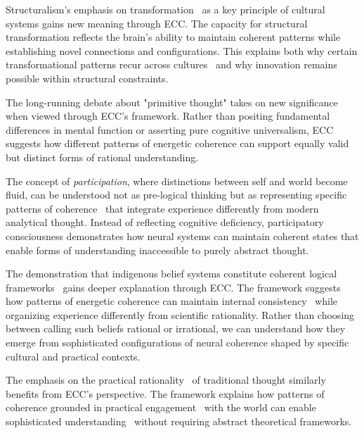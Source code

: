 Structuralism's emphasis on transformation~ as a key principle of cultural systems gains new meaning through ECC. The capacity for structural transformation reflects the brain's ability to maintain coherent patterns while establishing novel connections and configurations. This explains both why certain transformational patterns recur across cultures~ and why innovation remains possible within structural constraints.

The long-running debate about "primitive thought" takes on new significance when viewed through ECC's framework. Rather than positing fundamental differences in mental function or asserting pure cognitive universalism, ECC suggests how different patterns of energetic coherence can support equally valid but distinct forms of rational understanding.

The concept of \textit{participation}, where distinctions between self and world become fluid, can be understood not as pre-logical thinking but as representing specific patterns of coherence~ that integrate experience differently from modern analytical thought. Instead of reflecting cognitive deficiency, participatory consciousness demonstrates how neural systems can maintain coherent states that enable forms of understanding inaccessible to purely abstract thought.

The demonstration that indigenous belief systems constitute coherent logical frameworks~ gains deeper explanation through ECC. The framework suggests how patterns of energetic coherence can maintain internal consistency~ while organizing experience differently from scientific rationality. Rather than choosing between calling such beliefs rational or irrational, we can understand how they emerge from sophisticated configurations of neural coherence shaped by specific cultural and practical contexts.

The emphasis on the practical rationality~ of traditional thought similarly benefits from ECC's perspective. The framework explains how patterns of coherence grounded in practical engagement~ with the world can enable sophisticated understanding~ without requiring abstract theoretical frameworks.

